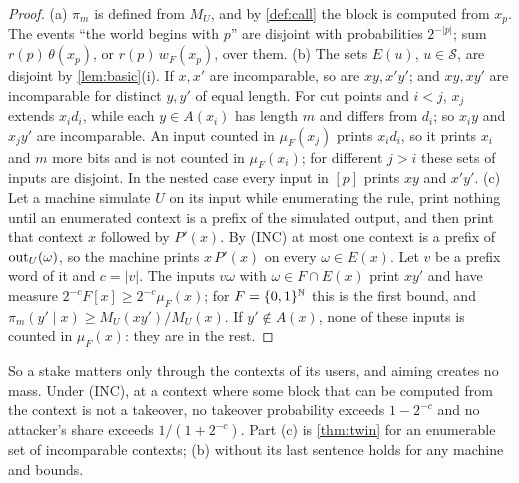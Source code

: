 \begin{proof}
(a) $\pi_m$ is defined from $M_U$, and by \cref{def:call} the block is computed from $x_p$. The events ``the
world begins with $p$'' are disjoint with probabilities $2^{-|p|}$; sum $r(p)\,\theta(x_p)$, or
$r(p)\,w_F(x_p)$, over them. (b) The sets $E(u)$, $u\in\mathcal S$, are disjoint by \cref{lem:basic}(i). If
$x,x'$ are incomparable, so are $xy,x'y'$; and $xy,xy'$ are incomparable for distinct $y,y'$ of equal length.
For cut points and $i<j$, $x_j$ extends $x_id_i$, while each $y\in A(x_i)$ has length $m$ and differs from
$d_i$; so $x_iy$ and $x_jy'$ are incomparable. An input counted in $\mu_F(x_j)$ prints $x_id_i$, so it prints
$x_i$ and $m$ more bits and is not counted in $\mu_F(x_i)$; for different $j>i$ these sets of inputs are
disjoint. In the nested case every input in $[p]$ prints $xy$ and $x'y'$. (c) Let a machine simulate $U$ on
its input while enumerating the rule, print nothing until an enumerated context is a prefix of the simulated
output, and then print that context $x$ followed by $P'(x)$. By (INC) at most one context is a prefix of
$\mathrm{out}_U(\omega)$, so the machine prints $x\,P'(x)$ on every $\omega\in E(x)$. Let $v$ be a prefix word of it
and $c=|v|$. The inputs $v\omega$ with $\omega\in F\cap E(x)$ print $xy'$ and have measure
$2^{-c}F[x]\ge2^{-c}\mu_F(x)$; for $F=\{0,1\}^{\mathbb{N}}$ this is the first bound, and $\pi_m(y'\mid x)\ge
M_U(xy')/M_U(x)$. If $y'\notin A(x)$, none of these inputs is counted in $\mu_F(x)$: they are in the rest.
\end{proof}

So a stake matters only through the contexts of its users, and aiming creates no mass. Under (INC), at a
context where some block that can be computed from the context is not a takeover, no takeover probability
exceeds $1-2^{-c}$ and no attacker's share exceeds $1/(1+2^{-c})$. Part (c) is \cref{thm:twin} for an
enumerable set of incomparable contexts; (b) without its last sentence holds for any machine and bounds.

